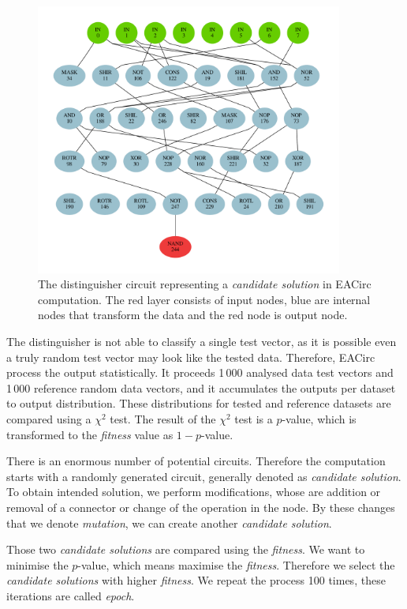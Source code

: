 \documentclass[
  print, %
  Table,   %
  nolof,     %
  nolot,     %
  11pt, %
  oneside  %
]{fithesis3}
\begin{document}
\begin{figure}[h]
  \centering
  \includegraphics[width=0.9\textwidth]{./graphics/gls/circuit}
\caption{The distinguisher circuit representing a \textit{candidate solution} in EACirc computation. The red layer consists of input nodes, blue are internal nodes that transform the data and the red node is output node.}
\label{fig:eac-circuit}
\end{figure}

The distinguisher is not able to classify a single test vector, as it is possible even a truly random test vector may look like the tested data. Therefore, EACirc process the output statistically. It proceeds 1\,000 analysed data test vectors and 1\,000 reference random data vectors, and it accumulates the outputs per dataset to output distribution. These distributions for tested and reference datasets are compared using a $\chi^{2}$ test. The result of the $\chi^{2}$ test is a $p$-value, which is transformed to the \textit{fitness} value as $1 - p$-value.

There is an enormous number of potential circuits. Therefore the computation starts with a randomly generated circuit, generally denoted as \textit{candidate solution}. To obtain intended solution, we perform modifications, whose are addition or removal of a connector or change of the operation in the node. By these changes that we denote \textit{mutation}, we can create another \textit{candidate solution}.

Those two \textit{candidate solutions} are compared using the \textit{fitness}. We want to minimise the $p$-value, which means maximise the \textit{fitness}. Therefore we select the \textit{candidate solutions} with higher \textit{fitness}. We repeat the process 100 times, these iterations are called \textit{epoch}.
\end{document}
